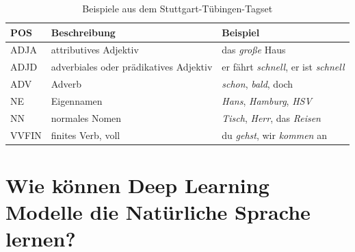 \begin{table}[h]
    \caption{Beispiele aus dem Stuttgart-Tübingen-Tagset}
    \label{STTS}
    \renewcommand{\arraystretch}{1.2}
    \centering
    \sffamily
    \begin{footnotesize}
        \begin{tabular}{l l l}
            \toprule
            \textbf{POS} & \textbf{Beschreibung}                  & \textbf{Beispiel}                                  \\
            \midrule
            ADJA         & attributives Adjektiv                  & das \textit{große} Haus                            \\
            ADJD         & adverbiales oder prädikatives Adjektiv & er fährt \textit{schnell}, er ist \textit{schnell} \\
            ADV          & Adverb                                 & \textit{schon}, \textit{bald}, doch                \\
            NE           & Eigennamen                             & \textit{Hans}, \textit{Hamburg}, \textit{HSV}      \\
            NN           & normales Nomen                         & \textit{Tisch}, \textit{Herr}, das \textit{Reisen} \\
            VVFIN        & finites Verb, voll                     & du \textit{gehst}, wir \textit{kommen} an          \\
            \bottomrule
        \end{tabular}
    \end{footnotesize}
    \rmfamily
\end{table}




\section{Wie können Deep Learning Modelle die Natürliche Sprache lernen?}


